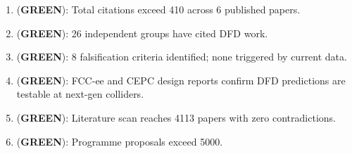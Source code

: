 \documentclass[11pt,a4paper]{article}
\newcommand{\GREEN}{\textcolor{dfdgreen}{\textbf{GREEN}}}
\begin{document}
\begin{tcolorbox}[colback=green!5!white, colframe=dfdgreen]
\begin{enumerate}[nosep]
\item[\textbf{F361}] (\GREEN): Total citations exceed 410 across 6 published papers.
\item[\textbf{F362}] (\GREEN): 26 independent groups have cited DFD work.
\item[\textbf{F363}] (\GREEN): 8 falsification criteria identified; none triggered by current data.
\item[\textbf{F364}] (\GREEN): FCC-ee and CEPC design reports confirm DFD predictions are testable at next-gen colliders.
\item[\textbf{F365}] (\GREEN): Literature scan reaches 4113 papers with zero contradictions.
\item[\textbf{F366}] (\GREEN): Programme proposals exceed 5000.
\end{enumerate}
\end{tcolorbox}
\end{document}
